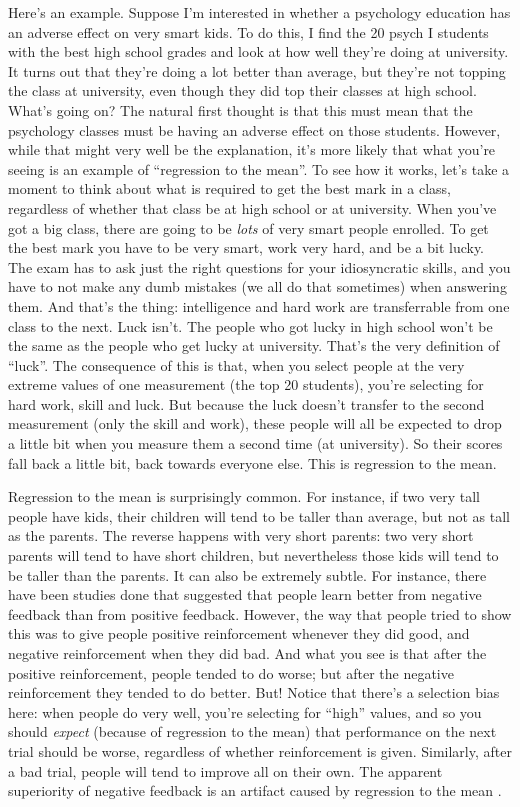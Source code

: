 \documentclass[]{book}
\begin{document}
Here's an example. Suppose I'm interested in whether a psychology education has an adverse effect on very smart kids. To do this, I find the 20 psych I students with the best high school grades and look at how well they're doing at university. It turns out that they're doing a lot better than average, but they're not topping the class at university, even though they did top their classes at high school. What's going on? The natural first thought is that this must mean that the psychology classes must be having an adverse effect on those students. However, while that might very well be the explanation, it's more likely that what you're seeing is an example of ``regression to the mean''. To see how it works, let's take a moment to think about what is required to get the best mark in a class, regardless of whether that class be at high school or at university. When you've got a big class, there are going to be \emph{lots} of very smart people enrolled. To get the best mark you have to be very smart, work very hard, and be a bit lucky. The exam has to ask just the right questions for your idiosyncratic skills, and you have to not make any dumb mistakes (we all do that sometimes) when answering them. And that's the thing: intelligence and hard work are transferrable from one class to the next. Luck isn't. The people who got lucky in high school won't be the same as the people who get lucky at university. That's the very definition of ``luck''. The consequence of this is that, when you select people at the very extreme values of one measurement (the top 20 students), you're selecting for hard work, skill and luck. But because the luck doesn't transfer to the second measurement (only the skill and work), these people will all be expected to drop a little bit when you measure them a second time (at university). So their scores fall back a little bit, back towards everyone else. This is regression to the mean.

Regression to the mean is surprisingly common. For instance, if two very tall people have kids, their children will tend to be taller than average, but not as tall as the parents. The reverse happens with very short parents: two very short parents will tend to have short children, but nevertheless those kids will tend to be taller than the parents. It can also be extremely subtle. For instance, there have been studies done that suggested that people learn better from negative feedback than from positive feedback. However, the way that people tried to show this was to give people positive reinforcement whenever they did good, and negative reinforcement when they did bad. And what you see is that after the positive reinforcement, people tended to do worse; but after the negative reinforcement they tended to do better. But! Notice that there's a selection bias here: when people do very well, you're selecting for ``high'' values, and so you should \emph{expect} (because of regression to the mean) that performance on the next trial should be worse, regardless of whether reinforcement is given. Similarly, after a bad trial, people will tend to improve all on their own. The apparent superiority of negative feedback is an artifact caused by regression to the mean \citep[see][ for discussion]{Kahneman1973}.
\end{document}
